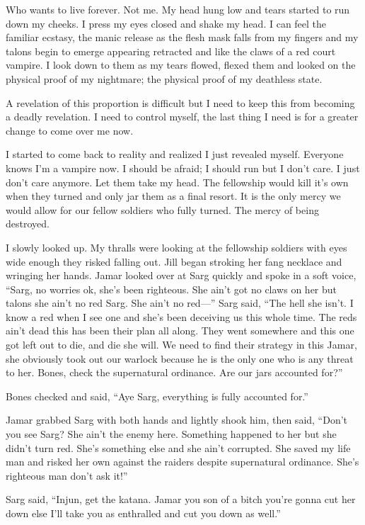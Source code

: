 Who wants to live forever. Not me. My head hung low and tears started to run down my cheeks. I press my eyes closed and shake my head. I can feel the familiar ecstasy, the manic release as the flesh mask falls from my fingers and my talons begin to emerge appearing retracted and like the claws of a red court vampire. I look down to them as my tears flowed, flexed them and looked on the physical proof of my nightmare; the physical proof of my deathless state.

A revelation of this proportion is difficult but I need to keep this from becoming a deadly revelation. I need to control myself, the last thing I need is for a greater change to come over me now.

I started to come back to reality and realized I just revealed myself. Everyone knows I'm a vampire now. I should be afraid; I should run but I don't care. I just don't care anymore. Let them take my head. The fellowship would kill it's own when they turned and only jar them as a final resort. It is the only mercy we would allow for our fellow soldiers who fully turned. The mercy of being destroyed.

I slowly looked up. My thralls were looking at the fellowship soldiers with eyes wide enough they risked falling out. Jill began stroking her fang necklace and wringing her hands. Jamar looked over at Sarg quickly and spoke in a soft voice, ``Sarg, no worries ok, she's been righteous. She ain't got no claws on her but talons she ain't no red Sarg. She ain't no red---'' Sarg said, ``The hell she isn't. I know a red when I see one and she's been deceiving us this whole time. The reds ain't dead this has been their plan all along. They went somewhere and this one got left out to die, and die she will. We need to find their strategy in this Jamar, she obviously took out our warlock because he is the only one who is any threat to her. Bones, check the supernatural ordinance. Are our jars accounted for?'' 

Bones checked and said, ``Aye Sarg, everything is fully accounted for.'' 

Jamar grabbed Sarg with both hands and lightly shook him, then said, ``Don't you see Sarg? She ain't the enemy here. Something happened to her but she didn't turn red. She's something else and she ain't corrupted. She saved my life man and risked her own against the raiders despite supernatural ordinance. She's righteous man don't ask it!''

Sarg said, ``Injun, get the katana. Jamar you son of a bitch you're gonna cut her down else I'll take you as enthralled and cut you down as well.'' 

